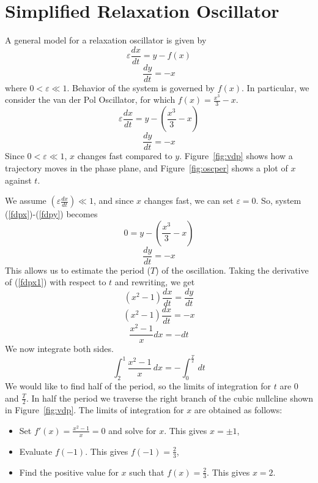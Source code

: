 \documentclass[]{article}
\numberwithin{equation}{section}		%
\begin{document}
\section{Simplified Relaxation Oscillator}
A general model for a relaxation oscillator is given by
\begin{equation}\label{rox}
\varepsilon\frac{dx}{dt}=y-f(x)
\end{equation}
\begin{equation}\label{roy}
\frac{dy}{dt}=-x
\end{equation}
where $0<\varepsilon\ll 1$. Behavior of the system is governed by $f(x)$. In particular, we consider the van der Pol Oscillator, for which $f(x)=\frac{x^3}{3}-x$.
\newpage
\begin{equation}\label{fdpx}
\varepsilon\frac{dx}{dt}=y-\left( \frac{x^3}{3}-x\right) 
\end{equation}
\begin{equation}\label{fdpy}
\frac{dy}{dt}=-x
\end{equation}
Since $0<\varepsilon\ll 1$, $x$ changes fast compared to $y$. Figure~\ref{fig:vdp} shows how a trajectory moves in the phase plane, and Figure~\ref{fig:oscper} shows a plot of $x$ against $t$. 

We assume $\left( \varepsilon\frac{dx}{dt}\right) \ll 1$, and since $x$ changes fast, we can set $\varepsilon=0$. So, system (\ref{fdpx})-(\ref{fdpy}) becomes
\begin{equation}\label{fdpx1}
0=y-\left( \frac{x^3}{3}-x\right) 
\end{equation}
\begin{equation}\label{fdpy1}
\frac{dy}{dt}=-x
\end{equation}
This allows us to estimate the period ($T$) of the oscillation. 
Taking the derivative of (\ref{fdpx1}) with respect to $t$ and rewriting, we get
$$(x^2-1)\frac{dx}{dt}=\frac{dy}{dt}$$
$$(x^2-1)\frac{dx}{dt}=-x$$
$$\frac{x^2-1}{x}dx=-dt$$
We now integrate both sides. 
\begin{equation}\label{perT}
\int_2^{1} \frac{x^2-1}{x} \,dx = -\int_0^{\frac{T}{2}}\,dt 
\end{equation}
We would like to find half of the period, so the limits of integration for $t$ are 0 and $\frac{T}{2}$. In half the period we traverse the right branch of the cubic nullcline shown in Figure~\ref{fig:vdp}. The limits of integration for $x$ are obtained as follows:
\begin{itemize}
\item Set $f'(x)=\frac{x^2-1}{x}=0$ and solve for $x$. This gives $x=\pm1$,
\item Evaluate $f(-1)$. This gives $f(-1)=\frac{2}{3}$, 
\item Find the positive value for $x$ such that $f(x)=\frac{2}{3}$. This gives $x=2$.
\end{itemize}
\end{document}
